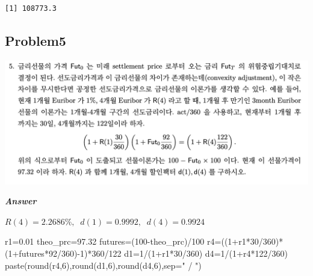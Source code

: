 \documentclass[
  a4paper,
  DIV=11,
  numbers=noendperiod]{scrreprt}
\newenvironment{Shaded}{\begin{snugshade}}{\end{snugshade}}
\newcommand{\AttributeTok}[1]{\textcolor[rgb]{0.40,0.45,0.13}{#1}}
\newcommand{\DecValTok}[1]{\textcolor[rgb]{0.68,0.00,0.00}{#1}}
\newcommand{\FloatTok}[1]{\textcolor[rgb]{0.68,0.00,0.00}{#1}}
\newcommand{\FunctionTok}[1]{\textcolor[rgb]{0.28,0.35,0.67}{#1}}
\newcommand{\NormalTok}[1]{\textcolor[rgb]{0.00,0.23,0.31}{#1}}
\newcommand{\OtherTok}[1]{\textcolor[rgb]{0.00,0.23,0.31}{#1}}
\newcommand{\SpecialCharTok}[1]{\textcolor[rgb]{0.37,0.37,0.37}{#1}}
\newcommand{\StringTok}[1]{\textcolor[rgb]{0.13,0.47,0.30}{#1}}
\begin{document}
\begin{verbatim}
[1] 108773.3
\end{verbatim}

\subsection*{Problem5}\label{problem5}

\includegraphics{images/이자율hw1_6.png}

\textbf{\emph{Answer}}

\(R(4)=2.2686\%,\;\;d(1)=0.9992,\;\;d(4)=0.9924\)

\begin{Shaded}
\begin{Highlighting}[]
\NormalTok{r1}\OtherTok{=}\FloatTok{0.01}
\NormalTok{theo\_prc}\OtherTok{=}\FloatTok{97.32}
\NormalTok{futures}\OtherTok{=}\NormalTok{(}\DecValTok{100}\SpecialCharTok{{-}}\NormalTok{theo\_prc)}\SpecialCharTok{/}\DecValTok{100}
\NormalTok{r4}\OtherTok{=}\NormalTok{((}\DecValTok{1}\SpecialCharTok{+}\NormalTok{r1}\SpecialCharTok{*}\DecValTok{30}\SpecialCharTok{/}\DecValTok{360}\NormalTok{)}\SpecialCharTok{*}\NormalTok{(}\DecValTok{1}\SpecialCharTok{+}\NormalTok{futures}\SpecialCharTok{*}\DecValTok{92}\SpecialCharTok{/}\DecValTok{360}\NormalTok{)}\SpecialCharTok{{-}}\DecValTok{1}\NormalTok{)}\SpecialCharTok{*}\DecValTok{360}\SpecialCharTok{/}\DecValTok{122}
\NormalTok{d1}\OtherTok{=}\DecValTok{1}\SpecialCharTok{/}\NormalTok{(}\DecValTok{1}\SpecialCharTok{+}\NormalTok{r1}\SpecialCharTok{*}\DecValTok{30}\SpecialCharTok{/}\DecValTok{360}\NormalTok{)}
\NormalTok{d4}\OtherTok{=}\DecValTok{1}\SpecialCharTok{/}\NormalTok{(}\DecValTok{1}\SpecialCharTok{+}\NormalTok{r4}\SpecialCharTok{*}\DecValTok{122}\SpecialCharTok{/}\DecValTok{360}\NormalTok{)}
\FunctionTok{paste}\NormalTok{(}\FunctionTok{round}\NormalTok{(r4,}\DecValTok{6}\NormalTok{),}\FunctionTok{round}\NormalTok{(d1,}\DecValTok{6}\NormalTok{),}\FunctionTok{round}\NormalTok{(d4,}\DecValTok{6}\NormalTok{),}\AttributeTok{sep=}\StringTok{" / "}\NormalTok{)}
\end{Highlighting}
\end{Shaded}
\end{document}
